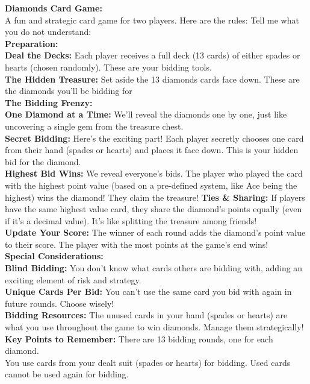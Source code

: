 \documentclass[runningheads]{llncs}
\begin{document}
\begin{thebibliography}{8}
\textbf{Diamonds Card Game:\\
}A fun and strategic card game for two players. 
Here are the rules: Tell me what you do not understand:\\
\textbf{Preparation:\\
}\textbf{Deal the Decks:} Each player receives a full deck (13 cards) of either spades or hearts (chosen randomly). These are your bidding tools.\\
\textbf{The Hidden Treasure:} Set aside the 13 diamonds cards face down. These are the diamonds you'll be bidding for\\
\textbf{The Bidding Frenzy:\\
}\textbf{One Diamond at a Time:} We'll reveal the diamonds one by one, just like uncovering a single gem from the treasure chest.\\
\textbf{Secret Bidding: }Here's the exciting part! Each player secretly chooses one card from their hand (spades or hearts) and places it face down. This is your hidden bid for the diamond.\\
\textbf{Highest Bid Wins:} We reveal everyone's bids. The player who played the card with the highest point value (based on a pre-defined system, like Ace being the highest) wins the diamond! They claim the treasure!
\textbf{Ties \& Sharing:} If players have the same highest value card, they share the diamond's points equally (even if it's a decimal value). It's like splitting the treasure among friends!\\
\textbf{Update Your Score:} The winner of each round adds the diamond's point value to their score. The player with the most points at the game's end wins!\\
\textbf{Special Considerations:\\}
\textbf{Blind Bidding: }You don't know what cards others are bidding with, adding an exciting element of risk and strategy.\\
\textbf{Unique Cards Per Bid: }You can't use the same card you bid with again in future rounds. Choose wisely!\\
\textbf{Bidding Resources: }The unused cards in your hand (spades or hearts) are what you use throughout the game to win diamonds. Manage them strategically!\\
\textbf{Key Points to Remember:}
There are 13 bidding rounds, one for each diamond.\\
You use cards from your dealt suit (spades or hearts) for bidding.
Used cards cannot be used again for bidding.\\


\end{thebibliography}
\end{document}
